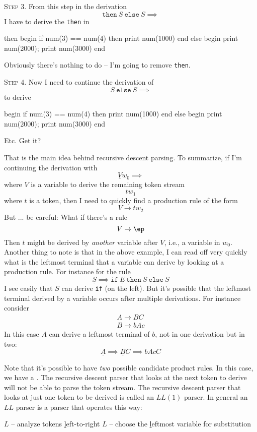 \textsc{Step 3.}
From this step in the derivation
\[
  \texttt{then} \ S \ \texttt{else} \ S
  \implies
\]
I have to derive the \texttt{then} in 
\begin{console}[commandchars=\\\{\}]
                    then
begin
    if num(3) == num(4) then
        print num(1000)
end
else
begin
    print num(2000);
    print num(3000)
end
\end{console}
Obviously there's nothing to do --  
I'm going to remove \texttt{then}.

\textsc{Step 4.}
Now I need to continue the derivation of
\[
  S \ \texttt{else} \ S
  \implies
\]
to derive
\begin{console}[commandchars=\\\{\}]      
begin
    if num(3) == num(4) then
        print num(1000)
end
else
begin
    print num(2000);
    print num(3000)
end
\end{console}

Etc. Get it?

That is the main idea behind recursive descent parsing.
To summarize, 
if I'm continuing the derivation with 
\[
\underline{V} w_0 \implies
\]
where $V$ is a variable
to derive the remaining token stream
\[
t w_1
\]
where $t$ is a token,
then I need to quickly find a production rule of the form
\[
V \rightarrow t w_2
\]
But ... be careful: What if there's a rule
\[
V \rightarrow \ep
\]
Then $t$ might be derived by \textit{another} variable after $V$,
i.e., a variable in $w_0$.
Another thing to note is that in the above example, I can read off very
quickly what is the leftmost terminal that a variable can derive
by looking at a production rule.
For instance for the rule
\[
\underline{S}
\implies \texttt{if} \ \underline{E} \ \texttt{then} \ S \ \texttt{else} \ S
\]
I see easily that $S$ can derive \texttt{if} (on the left).
But it's possible that the leftmost terminal derived by a variable
occurs after multiple derivations.
For instance consider
\begin{align*}
  A \rightarrow BC \\
  B \rightarrow bAc
\end{align*}
In this case $A$ can derive a leftmost terminal of $b$, not in one derivation
but in two:
\[
\underline{A} \implies \underline{B}C \implies bAcC
\]

Note that it's possible to have \textit{two} possible
candidate product rules.
In this case, we have a .
The recursive descent parser that looks at the next token
to derive will not be able to parse the token stream.
The recursive descent parser that looks at just one token to be derived
is called an $LL(1)$ parser. In general an $LL$ parser is a parser that
operates this way:
\begin{tightlist}
  \li $L$ -- analyze tokens \underline{l}eft-to-right
  \li $L$ -- choose the \underline{l}eftmost variable for substitution
\end{tightlist}

